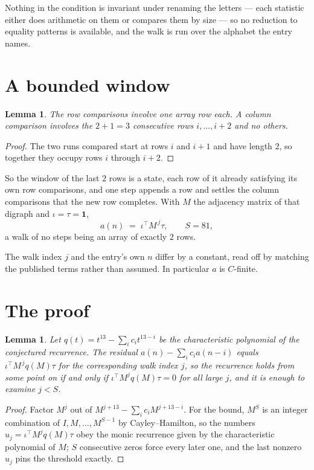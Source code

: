 \documentclass[11pt,a4paper]{article}
\theoremstyle{plain}
\newtheorem{lemma}[theorem]{Lemma}
\theoremstyle{definition}
\begin{document}
Nothing in the condition is invariant under renaming the letters --- each statistic either does
arithmetic on them or compares them by size --- so no reduction to equality patterns is
available, and the walk is run over the alphabet the entry names.

\section{A bounded window}

\begin{lemma}\label{lem:win}
The row comparisons involve one array row each. A column comparison involves the
$2+1=3$ consecutive rows $i,\dots,i{+}2$ and no others.
\end{lemma}

\begin{proof}
The two runs compared start at rows $i$ and $i+1$ and have length $2$, so together they
occupy rows $i$ through $i+2$.
\end{proof}

So the window of the last $2$ rows is a state, each row of it already satisfying its own row
comparisons, and one step appends a row and settles the column comparisons that the new row
completes. With $M$ the adjacency matrix of that digraph and $\iota=\tau=\mathbf{1}$,
\[
a(n)\;=\;\iota^{\!\top}M^{\,j}\tau ,\qquad S=81,
\]
a walk of no steps being an array of exactly $2$ rows.

The walk index $j$ and the entry's own $n$ differ by a constant, read off by matching the
published terms rather than assumed. In particular $a$ is $C$-finite.

\section{The proof}

\begin{lemma}\label{lem:crit}
Let $q(t)=t^{13}-\sum_i c_it^{13-i}$ be the characteristic polynomial of the
conjectured recurrence. The residual $a(n)-\sum_ic_ia(n-i)$ equals
$\iota^{\!\top}M^{\,j}q(M)\tau$ for the corresponding walk index $j$, so the recurrence
holds from some point on if and only if $\iota^{\!\top}M^{j}q(M)\tau=0$ for all large $j$,
and it is enough to examine $j<S$.
\end{lemma}

\begin{proof}
Factor $M^{j}$ out of $M^{j+13}-\sum_ic_iM^{j+13-i}$. For the bound, $M^{S}$
is an integer combination of $I,M,\dots,M^{S-1}$ by Cayley--Hamilton, so the numbers
$u_j=\iota^{\!\top}M^{j}q(M)\tau$ obey the monic recurrence given by the characteristic
polynomial of $M$; $S$ consecutive zeros force every later one, and the last nonzero $u_j$
pins the threshold exactly.
\end{proof}
\end{document}

